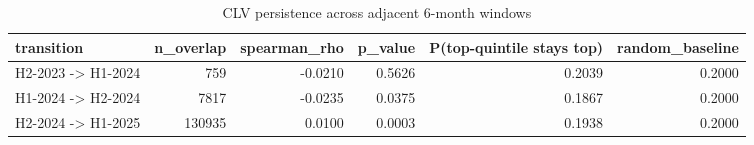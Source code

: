 \begin{table}
\caption{CLV persistence across adjacent 6-month windows}
\label{tab:persistence}
\begin{tabular}{lrrrrr}
\toprule
transition & n_overlap & spearman_rho & p_value & P(top-quintile stays top) & random_baseline \\
\midrule
H2-2023 -> H1-2024 & 759 & -0.0210 & 0.5626 & 0.2039 & 0.2000 \\
H1-2024 -> H2-2024 & 7817 & -0.0235 & 0.0375 & 0.1867 & 0.2000 \\
H2-2024 -> H1-2025 & 130935 & 0.0100 & 0.0003 & 0.1938 & 0.2000 \\
\bottomrule
\end{tabular}
\end{table}
